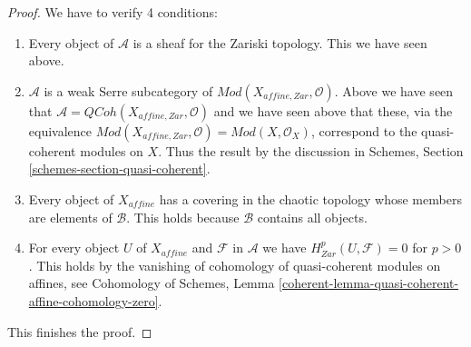 \documentclass{stacks-project}
\theoremstyle{plain}
\theoremstyle{definition}
\theoremstyle{remark}
\numberwithin{equation}{subsection}
\def\QCoh{\mathit{QCoh}}
\begin{document}
\begin{proof}
\medskip\noindent
We have to verify 4 conditions:
\begin{enumerate}
\item Every object of $\mathcal{A}$ is a sheaf for the Zariski topology.
This we have seen above.
\item $\mathcal{A}$ is a weak Serre subcategory of
$\textit{Mod}(X_{affine, Zar}, \mathcal{O})$. Above we have
seen that $\mathcal{A} = \QCoh(X_{affine, Zar}, \mathcal{O})$ and
we have seen above that these,
via the equivalence $\textit{Mod}(X_{affine, Zar}, \mathcal{O}) =
\textit{Mod}(X, \mathcal{O}_X)$, correspond to the quasi-coherent modules
on $X$. Thus the result by the discussion in
Schemes, Section \ref{schemes-section-quasi-coherent}.
\item Every object of $X_{affine}$ has a covering in the chaotic
topology whose members are elements of $\mathcal{B}$. This holds
because $\mathcal{B}$ contains all objects.
\item For every object $U$ of $X_{affine}$ and $\mathcal{F}$ in $\mathcal{A}$
we have $H^p_{Zar}(U, \mathcal{F}) = 0$ for $p > 0$.
This holds by the vanishing of cohomology of quasi-coherent modules
on affines, see
Cohomology of Schemes, Lemma
\ref{coherent-lemma-quasi-coherent-affine-cohomology-zero}.
\end{enumerate}
This finishes the proof.
\end{proof}
\end{document}
